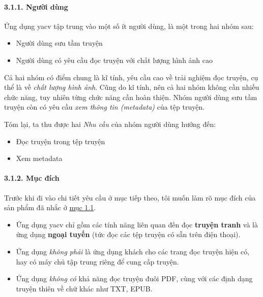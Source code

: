 \documentclass[
]{article}
\providecommand{\tightlist}{%
  \setlength{\itemsep}{0pt}\setlength{\parskip}{0pt}}
\begin{document}
\hypertarget{ngux1b0ux1eddi-duxf9ng}{%
\paragraph{\texorpdfstring{3.1.1. Người dùng
}{3.1.1. Người dùng }}\label{ngux1b0ux1eddi-duxf9ng}}

Ứng dụng yacv tập trung vào một số ít người dùng, là một trong hai nhóm
sau:

\begin{itemize}
\tightlist
\item
  Người dùng sưu tầm truyện
\item
  Người dùng có yêu cầu đọc truyện với chất lượng hình ảnh cao
\end{itemize}

Cả hai nhóm có điểm chung là kĩ tính, yêu cầu cao về trải nghiệm đọc
truyện, cụ thể là về \emph{chất lượng hình ảnh}. Cũng do kĩ tính, nên cả
hai nhóm không cần nhiều chức năng, tuy nhiên từng chức năng cần hoàn
thiện. Nhóm người dùng sưu tầm truyện còn có yêu cầu \emph{xem thông tin
(metadata)} của tệp truyện.

Tóm lại, ta thu được hai \emph{Nhu cầu} của nhóm người dùng hướng đến:

\begin{itemize}
\tightlist
\item
  Đọc truyện trong tệp truyện
\item
  Xem metadata
\end{itemize}

\hypertarget{mux1ee5c-ux111uxedch}{%
\paragraph{\texorpdfstring{3.1.2. Mục đích
}{3.1.2. Mục đích }}\label{mux1ee5c-ux111uxedch}}

Trước khi đi vào chi tiết yêu cầu ở mục tiếp theo, tôi muốn làm rõ mục
đích của sản phẩm đã nhắc ở \protect\hyperlink{P1.1-background}{mục
1.1}.

\begin{itemize}
\tightlist
\item
  Ứng dụng yacv chỉ gồm các tính năng liên quan đến đọc \textbf{truyện
  tranh} và là ứng dụng \textbf{ngoại tuyến} (tức đọc các tệp truyện có
  sẵn trên điện thoại).
\item
  Ứng dụng \emph{không phải} là ứng dụng khách cho các trang đọc truyện
  hiện có, hay có máy chủ tập trung riêng để cung cấp truyện.
\item
  Ứng dụng \emph{không có} khả năng đọc truyện đuôi PDF, cùng với các
  định dạng truyện thiên về chữ khác như TXT, EPUB.
\end{itemize}
\end{document}
